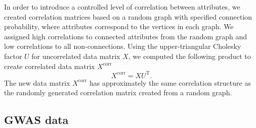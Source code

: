 \documentclass[aos]{imsart}
\begin{document}
In order to introduce a controlled level of correlation between attributes, we created correlation matrices based on a random graph with specified connection probability, where attributes correspond to the vertices in each graph. We assigned high correlations to connected attributes from the random graph and low correlations to all non-connections. Using the upper-triangular Cholesky factor $U$ for uncorrelated data matrix $X$, we computed the following product to create correlated data matrix $X^\text{corr}$
%
\begin{equation}\label{eq:cholesky}
X^\text{corr} = X U^\text{T}.
\end{equation}
The new data matrix $X^\text{corr}$ has approximately the same correlation structure as the randomly generated correlation matrix created from a random graph. 
%

\subsection{GWAS data}
\end{document}
